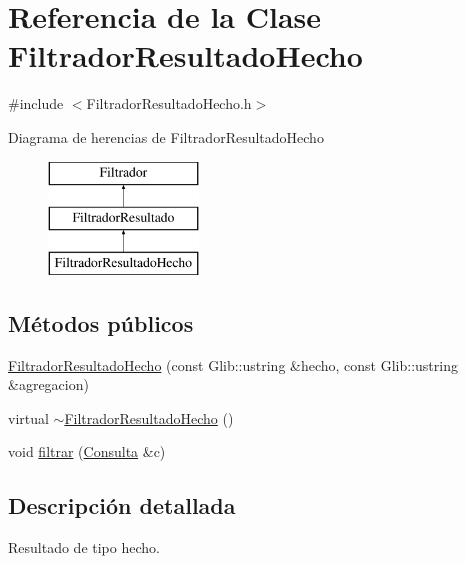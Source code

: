 \hypertarget{classFiltradorResultadoHecho}{\section{\-Referencia de la \-Clase \-Filtrador\-Resultado\-Hecho}
\label{classFiltradorResultadoHecho}
}


{\ttfamily \#include $<$\-Filtrador\-Resultado\-Hecho.\-h$>$}

\-Diagrama de herencias de \-Filtrador\-Resultado\-Hecho\begin{figure}[H]
\begin{center}
\leavevmode
\includegraphics[height=3.000000cm]{classFiltradorResultadoHecho}
\end{center}
\end{figure}
\subsection*{\-Métodos públicos}
\begin{DoxyCompactItemize}
\item 
\hyperlink{classFiltradorResultadoHecho_a9264f0fd7751c390e9c81723525af31b}{\-Filtrador\-Resultado\-Hecho} (const \-Glib\-::ustring \&hecho, const \-Glib\-::ustring \&agregacion)
\item 
virtual \hyperlink{classFiltradorResultadoHecho_add342e2c81ccfdde25f0a1c56599ed8a}{$\sim$\-Filtrador\-Resultado\-Hecho} ()
\item 
void \hyperlink{classFiltradorResultadoHecho_adfcbfa61c6efe4003a7b2170ecc44e59}{filtrar} (\hyperlink{classConsulta}{\-Consulta} \&c)
\end{DoxyCompactItemize}


\subsection{\-Descripción detallada}
\-Resultado de tipo hecho. 

